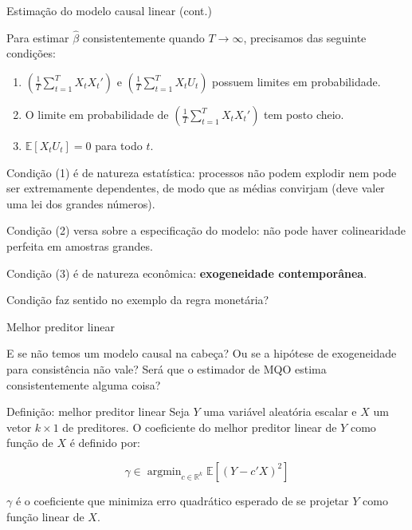 \documentclass[11pt]{beamer}
\newenvironment{halfwideitemize}{\itemize\addtolength{\itemsep}{0.5em}}{\enditemize}
\begin{document}
	\begin{frame}{Estimação do modelo causal linear (cont.)}
		\begin{halfwideitemize}
			\item Para estimar $\hat{\beta}$ {\color{blue}consistentemente} quando $T \to \infty$, precisamos das seguinte condições:
		\begin{enumerate}
			\item $\left(\frac{1}{T}\sum_{t=1}^T X_t X_t'\right)$ e $\left(\frac{1}{T}\sum_{t=1}^T X_t U_t\right)$ possuem limites em probabilidade.
			\item O limite em probabilidade de $\left(\frac{1}{T}\sum_{t=1}^T X_t X_t'\right)$ tem posto cheio.
			\item $\mathbb{E}[X_t U_t] = 0$ para todo $t$.
		\end{enumerate}
		\item Condição (1) é de natureza {\color{blue}estatística}: processos não podem explodir nem pode ser extremamente dependentes, de modo que as médias convirjam (deve valer uma lei dos grandes números).
		\item Condição (2) versa sobre a {\color{blue}especificação} do modelo: não pode haver colinearidade perfeita em amostras grandes.
		\item Condição (3) é de natureza {\color{blue}econômica}: \textbf{exogeneidade contemporânea}.
		\begin{halfwideitemize}
		\item Condição faz sentido no exemplo da regra monetária?
		\end{halfwideitemize}
	\end{halfwideitemize}
	\end{frame}
	
	\begin{frame}{Melhor preditor linear}
		\begin{halfwideitemize}
			
			\item E se não temos um modelo causal na cabeça? Ou se a hipótese de exogeneidade para consistência não vale? Será que o estimador de MQO estima consistentemente alguma coisa?
		\end{halfwideitemize}
		\begin{block}{Definição: melhor preditor linear}
			Seja $Y$ uma variável aleatória escalar e $X$ um vetor $k\times 1$ de preditores. O {\color{blue}coeficiente do melhor preditor linear} de $Y$ como função de $X$ é {\color{red}definido} por:
			
			$$\gamma \in \operatorname{argmin}_{c \in \mathbb{R}^k} \mathbb{E}[(Y-c'X)^2]$$
		\end{block}
		\begin{halfwideitemize}
			\item $\gamma$ é o coeficiente que minimiza erro quadrático esperado de se projetar $Y$ como função linear de $X$.
		\end{halfwideitemize}
	\end{frame}
	
\end{document}
